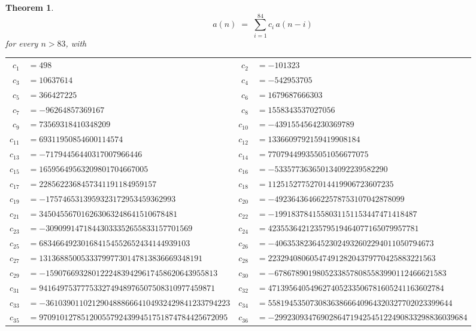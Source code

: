 \documentclass[11pt,a4paper]{article}
\theoremstyle{plain}
\newtheorem{theorem}{Theorem}
\theoremstyle{definition}
\begin{document}
\begin{theorem}
\[
a(n)\;=\;\sum_{i=1}^{84}c_i\,a(n-i)
\]
for every $n>83$, with
\begin{center}\footnotesize
\begin{tabular}{r@{\,}l@{\qquad}r@{\,}l}
$c_{1}$ & $=498$ & $c_{2}$ & $=-101323$ \\
$c_{3}$ & $=10637614$ & $c_{4}$ & $=-542953705$ \\
$c_{5}$ & $=366427225$ & $c_{6}$ & $=1679687666303$ \\
$c_{7}$ & $=-96264857369167$ & $c_{8}$ & $=1558343537027056$ \\
$c_{9}$ & $=73569318410348209$ & $c_{10}$ & $=-4391554564230369789$ \\
$c_{11}$ & $=69311950854600114574$ & $c_{12}$ & $=1336609792159419908184$ \\
$c_{13}$ & $=-71794456440317007966446$ & $c_{14}$ & $=770794499355051056677075$ \\
$c_{15}$ & $=16595649563209801704667005$ & $c_{16}$ & $=-533577363650134092239582290$ \\
$c_{17}$ & $=2285622368457341191184959157$ & $c_{18}$ & $=112515277527014419906723607235$ \\
$c_{19}$ & $=-1757465313959323172953459362993$ & $c_{20}$ & $=-4923643646622578753107042878099$ \\
$c_{21}$ & $=345045567016263063248641510678481$ & $c_{22}$ & $=-1991837841558031151153447471418487$ \\
$c_{23}$ & $=-30909914718443033352655833157701569$ & $c_{24}$ & $=423553642123579519464077165079957781$ \\
$c_{25}$ & $=683466492301684154552652434144939103$ & $c_{26}$ & $=-40635382364523024932602294011050794673$ \\
$c_{27}$ & $=131368850053337997730147813836669348191$ & $c_{28}$ & $=2232940806054749128204379770425883221563$ \\
$c_{29}$ & $=-15907669328012224839429617458620643955813$ & $c_{30}$ & $=-67867890198052338578085583990112466621583$ \\
$c_{31}$ & $=941649753777533274948976507508310977459871$ & $c_{32}$ & $=471395640549627405233506781605241163602784$ \\
$c_{33}$ & $=-36103901102129048886664104932429841233794223$ & $c_{34}$ & $=55819453507308363866640964320327702023399644$ \\
$c_{35}$ & $=970910127851200557924399451751874784425672095$ & $c_{36}$ & $=-2992309347690286471942545122490833298836039684$ \\

\end{tabular}
\end{center}
\end{theorem}
\end{document}
